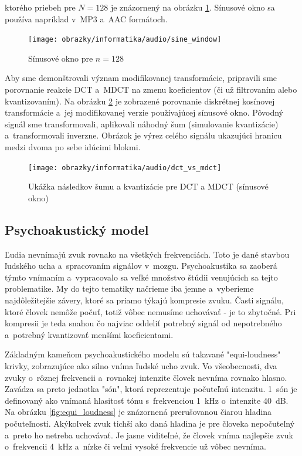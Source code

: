 ktorého priebeh pre $N=128$ je znázornený na obrázku
\ref{fig:sine_window}. Sínusové okno sa používa napríklad v~MP3 a~AAC
formátoch.

\begin{figure}[htp]
    \centering
    \texttt{[image: obrazky/informatika/audio/sine\_window]}
    \caption{Sínusové okno pre $n=128$}
    \label{fig:sine_window}
\end{figure}

Aby sme demonštrovali význam modifikovanej transformácie, pripravili
sme porovnanie reakcie DCT a~MDCT na zmenu koeficientov (či už
filtrovaním alebo kvantizovaním).
Na obrázku \ref{fig:dct_vs_mdct} je zobrazené porovnanie diskrétnej
kosínovej transformácie a~jej modifikovanej verzie používajúcej
sínusové okno.
Pôvodný signál sme transformovali, aplikovali náhodný šum (simulovanie
kvantizácie) a~transformovali inverzne. Obrázok je výrez celého
signálu ukazujúci hranicu medzi dvoma po sebe idúcimi blokmi.
\begin{figure}[htp]
    \centering
    \texttt{[image: obrazky/informatika/audio/dct\_vs\_mdct]}
    \caption{Ukážka následkov šumu a kvantizácie pre DCT a MDCT (sínusové okno)}
    \label{fig:dct_vs_mdct}
\end{figure}

\subsection{Psychoakustický model}
Ľudia nevnímajú zvuk rovnako na všetkých frekvenciách. Toto je dané
stavbou ľudského ucha a~spracovaním signálov v~mozgu. Psychoakustika
sa zaoberá týmto vnímaním a~vypracovalo sa veľké množstvo štúdii
venujúcich sa tejto problematike. My do tejto tematiky načrieme iba jemne
a~vyberieme najdôležitejšie závery, ktoré sa priamo týkajú
kompresie zvuku. Časti signálu, ktoré človek nemôže počuť, totiž vôbec
nemusíme uchovávať - je to zbytočné. Pri kompresii je teda snahou čo
najviac oddeliť potrebný signál od nepotrebného a~potrebný kvantizovať
menšími koeficientami.

Základným kameňom psychoakustického modelu sú takzvané "equi-loudness"
krivky, zobrazujúce ako silno vníma ľudské ucho zvuk. Vo všeobecnosti,
dva zvuky o~rôznej frekvencii a~rovnakej intenzite človek nevníma 
rovnako hlasno.
Zavádza sa preto jednotka "són", ktorá reprezentuje počuteľnú
intenzitu. 1~són je definovaný ako vnímaná hlasitosť tónu s~frekvenciou
1~kHz o~intenzite 40~dB. Na obrázku \ref{fig:equi_loudness} je
znázornená prerušovanou čiarou hladina počuteľnosti. Akýkoľvek zvuk
tichší ako daná hladina je pre človeka nepočuteľný a~preto ho netreba
uchovávať. Je jasne viditeľné, že človek vníma najlepšie zvuk 
o~frekvencii 4~kHz a~nízke či veľmi vysoké frekvencie už vôbec nevníma.

